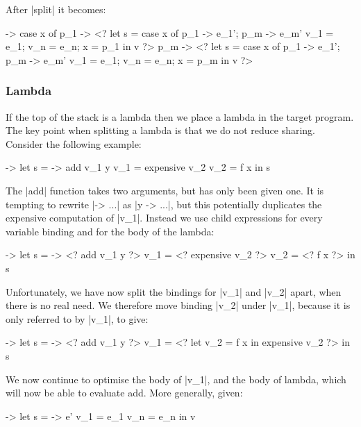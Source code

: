\documentclass[draft]{sigplanconf}
\begin{document}
\noindent After |split| it becomes:

\begin{code}
\free -> case x of
    p_1  -> <? let  s    = case x of p_1 -> e_1'; p_m -> e_m'
                    v_1  = e_1; v_n = e_n; x = p_1 in v ?>
    p_m  -> <? let  s    = case x of p_1 -> e_1'; p_m -> e_m'
                    v_1  = e_1; v_n = e_n; x = p_m in v ?>
\end{code}

\subsubsection{Lambda}
\label{sec:eval_split_lambda}

If the top of the stack is a lambda then we place a lambda in the target program. The key point when splitting a lambda is that we do not reduce sharing. Consider the following example:

\begin{code}
\x ->  let  s    = \y -> add v_1 y
            v_1  = expensive v_2
            v_2  = f x
       in   s
\end{code}

The |add| function takes two arguments, but has only been given one. It is tempting to rewrite |\x -> ...| as |\x y -> ...|, but this potentially duplicates the expensive computation of |v_1|. Instead we use child expressions for every variable binding and for the body of the lambda:

\begin{code}
\x ->  let  s    = \y -> <? add v_1 y ?>
            v_1  = <? expensive v_2 ?>
            v_2  = <? f x ?>
       in   s
\end{code}

Unfortunately, we have now split the bindings for |v_1| and |v_2| apart, when there is no real need. We therefore move binding |v_2| under |v_1|, because it is only referred to by |v_1|, to give:

\begin{code}
\x ->  let  s    = \y -> <? add v_1 y ?>
            v_1  = <? let v_2 = f x in expensive v_2 ?>
       in   s
\end{code}

We now continue to optimise the body of |v_1|, and the body of lambda, which will now be able to evaluate add. More generally, given:

\begin{code}
\free ->  let  s    = \x -> e'
               v_1  = e_1
               v_n  = e_n
          in   v
\end{code}
\end{document}
